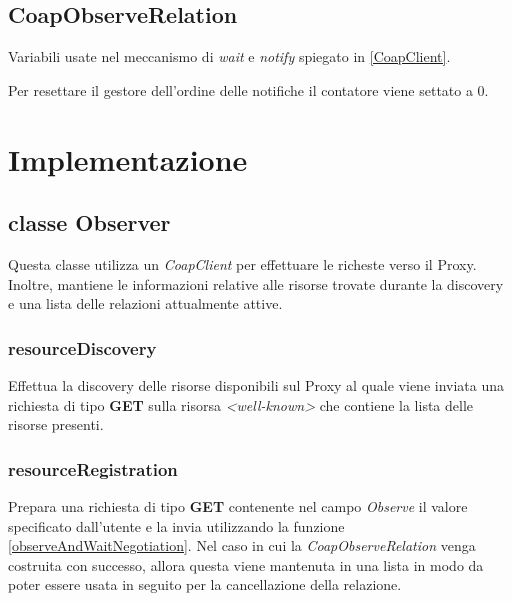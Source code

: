 			\subsection{CoapObserveRelation}
				Variabili usate nel meccanismo di \textit{wait} e \textit{notify} spiegato in \ref{CoapClient}. \newline
				
				
				Per resettare il gestore dell'ordine delle notifiche il contatore viene settato a 0.\newline
				

	\section{Implementazione}
		\subsection{classe Observer}
			Questa classe utilizza un \textit{CoapClient} per effettuare le richeste verso il Proxy. Inoltre, mantiene le informazioni relative alle risorse trovate durante la discovery e una lista delle relazioni attualmente attive.
			\subsubsection{resourceDiscovery}
			Effettua la discovery delle risorse disponibili sul Proxy al quale viene inviata una richiesta di tipo \textbf{GET} sulla risorsa \textit{<well-known>} che contiene la lista delle risorse presenti.
			

			\subsubsection{resourceRegistration}
				Prepara una richiesta di tipo \textbf{GET} contenente nel campo \textit{Observe} il valore specificato dall'utente e la invia utilizzando la funzione \ref{observeAndWaitNegotiation}. Nel caso in cui la \textit{CoapObserveRelation} venga costruita con successo, allora questa viene mantenuta in una lista in modo da poter essere usata in seguito per la cancellazione della relazione.
				

